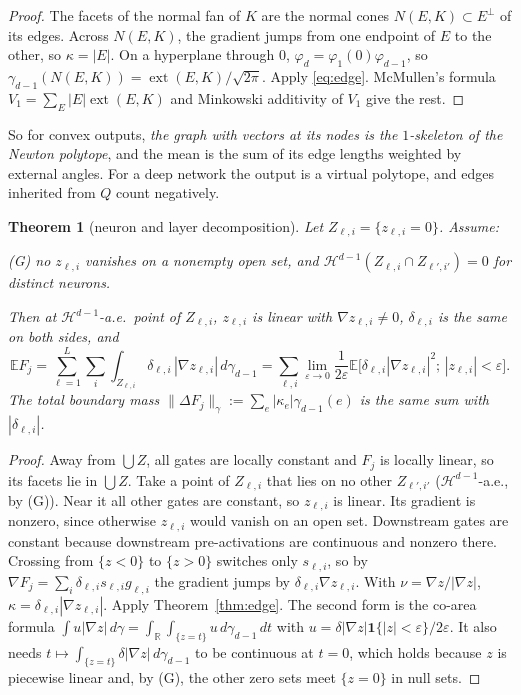 \documentclass[11pt]{article}
\newtheorem{theorem}{Theorem}[section]
\theoremstyle{definition}
\theoremstyle{remark}
\newcommand{\R}{\mathbb R}
\newcommand{\E}{\mathbb E}
\newcommand{\ext}{\operatorname{ext}}
\newcommand{\Hd}{\mathcal H^{d-1}}
\begin{document}
\begin{proof}
The facets of the normal fan of $K$ are the normal cones $N(E,K)\subset E^\perp$ of its edges. Across $N(E,K)$, the gradient jumps from one endpoint of $E$ to the other, so $\kappa=|E|$. On a hyperplane through $0$, $\varphi_d=\varphi_1(0)\varphi_{d-1}$, so $\gamma_{d-1}(N(E,K))=\ext(E,K)/\sqrt{2\pi}$. Apply \eqref{eq:edge}. McMullen's formula $V_1=\sum_E|E|\ext(E,K)$ and Minkowski additivity of $V_1$ give the rest.
\end{proof}

So for convex outputs, \emph{the graph with vectors at its nodes is the $1$-skeleton of the Newton polytope}, and the mean is the sum of its edge lengths weighted by external angles. For a deep network the output is a virtual polytope, and edges inherited from $Q$ count negatively.

\begin{theorem}[neuron and layer decomposition]\label{thm:neuron}
Let $Z_{\ell,i}=\{z_{\ell,i}=0\}$. Assume:

(G) no $z_{\ell,i}$ vanishes on a nonempty open set, and $\Hd(Z_{\ell,i}\cap Z_{\ell',i'})=0$ for distinct neurons.

Then at $\Hd$-a.e.\ point of $Z_{\ell,i}$, $z_{\ell,i}$ is linear with $\nabla z_{\ell,i}\ne0$, $\delta_{\ell,i}$ is the same on both sides, and
\begin{equation}\label{eq:neuron}
\E F_j=\sum_{\ell=1}^L\sum_{i}\int_{Z_{\ell,i}}\delta_{\ell,i}\,|\nabla z_{\ell,i}|\,d\gamma_{d-1}
=\sum_{\ell,i}\lim_{\varepsilon\to0}\frac1{2\varepsilon}\E\big[\delta_{\ell,i}|\nabla z_{\ell,i}|^2;\,|z_{\ell,i}|<\varepsilon\big].
\end{equation}
The total boundary mass $\|\Delta F_j\|_\gamma:=\sum_e|\kappa_e|\gamma_{d-1}(e)$ is the same sum with $|\delta_{\ell,i}|$.
\end{theorem}

\begin{proof}
Away from $\bigcup Z$, all gates are locally constant and $F_j$ is locally linear, so its facets lie in $\bigcup Z$. Take a point of $Z_{\ell,i}$ that lies on no other $Z_{\ell',i'}$ ($\Hd$-a.e., by (G)). Near it all other gates are constant, so $z_{\ell,i}$ is linear. Its gradient is nonzero, since otherwise $z_{\ell,i}$ would vanish on an open set. Downstream gates are constant because downstream pre-activations are continuous and nonzero there. Crossing from $\{z<0\}$ to $\{z>0\}$ switches only $s_{\ell,i}$, so by $\nabla F_j=\sum_i\delta_{\ell,i}s_{\ell,i}g_{\ell,i}$ the gradient jumps by $\delta_{\ell,i}\nabla z_{\ell,i}$. With $\nu=\nabla z/|\nabla z|$, $\kappa=\delta_{\ell,i}|\nabla z_{\ell,i}|$. Apply Theorem~\ref{thm:edge}. The second form is the co-area formula $\int u|\nabla z|\,d\gamma=\int_{\R}\int_{\{z=t\}}u\,d\gamma_{d-1}\,dt$ with $u=\delta|\nabla z|\mathbf 1\{|z|<\varepsilon\}/2\varepsilon$. It also needs $t\mapsto\int_{\{z=t\}}\delta|\nabla z|\,d\gamma_{d-1}$ to be continuous at $t=0$, which holds because $z$ is piecewise linear and, by (G), the other zero sets meet $\{z=0\}$ in null sets.
\end{proof}
\end{document}
